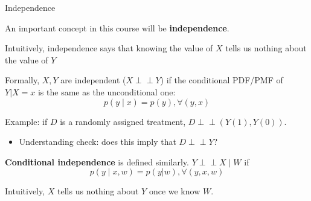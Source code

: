 \documentclass[11pt,english,handout]{beamer}
\newenvironment{wideitemize}{\itemize\addtolength{\itemsep}{10pt}}{\enditemize}
\newcommand{\indep}{\perp\!\!\!\!\perp}
\begin{document}
\begin{frame}{Independence}

\begin{wideitemize} 
	
\item
An important concept in this course will be \textbf{independence}.

\item
Intuitively, independence says that knowing the value of $X$ tells us nothing about the value of $Y$


\item
Formally, $X,Y$ are independent ($X \indep Y$) if the conditional PDF/PMF of $Y|X=x$ is the same as the unconditional one: 	
$$ p(y\mid x)=p(y), \forall (y,x)$$


\pause
\item 
Example: if $D$ is a randomly assigned treatment, $D \indep (Y(1),Y(0))$. 
\pause
\begin{itemize}
	\item 
	Understanding check: does this imply that $D \indep Y$?
\end{itemize}

\pause 

\item
\textbf{Conditional independence} is defined similarly. $Y \indep X \mid W$ if 
$$ p(y\mid x,w)=p(y|w), \forall (y,x,w)$$

\item
Intuitively, $X$ tells us nothing about $Y$ once we know $W$.
\end{wideitemize}
\end{frame}
\end{document}
